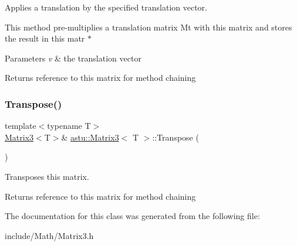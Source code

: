 Applies a translation by the specified translation vector.

This method pre-\/multiplies a translation matrix \textquotesingle{}Mt\textquotesingle{} with this matrix and stores the result in this matr $\ast$ 
\begin{DoxyParams}{Parameters}
{\em v} & the translation vector\\
\hline
\end{DoxyParams}
\begin{DoxyReturn}{Returns}
reference to this matrix for method chaining 
\end{DoxyReturn}
\mbox{\label{classastu_1_1Matrix3_a8cfa018da9fa68ea48c42e1100110a07}} 
\subsubsection{\texorpdfstring{Transpose()}{Transpose()}}
{\footnotesize\ttfamily template$<$typename T$>$ \\
\hyperlink{classastu_1_1Matrix3}{Matrix3}$<$T$>$\& \hyperlink{classastu_1_1Matrix3}{astu\+::\+Matrix3}$<$ T $>$\+::Transpose (\begin{DoxyParamCaption}{ }\end{DoxyParamCaption})\hspace{0.3cm}{\ttfamily [inline]}}

Transposes this matrix.

\begin{DoxyReturn}{Returns}
reference to this matrix for method chaining 
\end{DoxyReturn}


The documentation for this class was generated from the following file\+:\begin{DoxyCompactItemize}
\item 
include/\+Math/Matrix3.\+h\end{DoxyCompactItemize}
